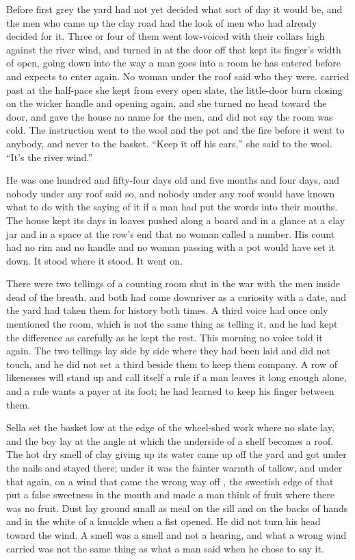 
Before first grey the yard had not yet decided what sort of day it would be, and the men who came up the clay road had the look of men who had already decided for it. Three or four of them went low-voiced with their collars high against the river wind, and turned in at the door off  that kept its finger's width of open, going down into  the way a man goes into a room he has entered before and expects to enter again. No woman under the roof said who they were.  carried  past at the half-pace she kept from every open slate, the little-door burn closing on the wicker handle and opening again, and she turned no head toward the door, and gave the house no name for the men, and did not say the room was cold. The instruction went to the wool and the pot and the fire before it went to anybody, and never to the basket. “Keep it off his ears,” she said to the wool. “It's the river wind.”

He was one hundred and fifty-four days old and five months and four days, and nobody under any roof said so, and nobody under any roof would have known what to do with the saying of it if a man had put the words into their mouths. The house kept its days in loaves pushed along a board and in a glance at a clay jar and in a space at the row's end that no woman called a number. His count had no rim and no handle and no woman passing with a pot would have set it down. It stood where it stood. It went on.

There were two tellings of a counting room shut in the war with the men inside dead of the breath, and both had come downriver as a curiosity with a date, and the yard had taken them for history both times. A third voice had once only mentioned the room, which is not the same thing as telling it, and he had kept the difference as carefully as he kept the rest. This morning no voice told it again. The two tellings lay side by side where they had been laid and did not touch, and he did not set a third beside them to keep them company. A row of likenesses will stand up and call itself a rule if a man leaves it long enough alone, and a rule wants a payer at its foot; he had learned to keep his finger between them.

\scenebreak

Sella set the basket low at the edge of the wheel-shed work where no slate lay, and the boy lay at the angle at which the underside of a shelf becomes a roof. The hot dry smell of clay giving up its water came up off the yard and got under the nails and stayed there; under it was the fainter warmth of tallow, and under that again, on a wind that came the wrong way off , the sweetish edge of  that put a false sweetness in the mouth and made a man think of fruit where there was no fruit. Dust lay ground small as meal on the sill and on the backs of hands and in the white of a knuckle when a fist opened. He did not turn his head toward the wind. A smell was a smell and not a hearing, and what a wrong wind carried was not the same thing as what a man said when he chose to say it.

